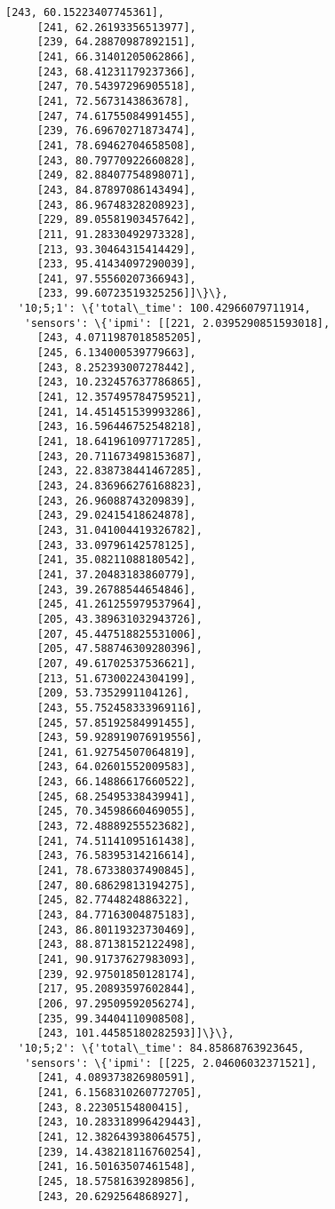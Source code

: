 \documentclass[11pt]{article}
\begin{document}
\begin{tcolorbox}[breakable, size=fbox, boxrule=.5pt, pad at break*=1mm, opacityfill=0]
\begin{Verbatim}[commandchars=\\\{\}]
     [243, 60.15223407745361],
     [241, 62.26193356513977],
     [239, 64.28870987892151],
     [241, 66.31401205062866],
     [243, 68.41231179237366],
     [247, 70.54397296905518],
     [241, 72.5673143863678],
     [247, 74.61755084991455],
     [239, 76.69670271873474],
     [241, 78.69462704658508],
     [243, 80.79770922660828],
     [249, 82.88407754898071],
     [243, 84.87897086143494],
     [243, 86.96748328208923],
     [229, 89.05581903457642],
     [211, 91.28330492973328],
     [213, 93.30464315414429],
     [233, 95.41434097290039],
     [241, 97.55560207366943],
     [233, 99.60723519325256]]\}\},
  '10;5;1': \{'total\_time': 100.42966079711914,
   'sensors': \{'ipmi': [[221, 2.0395290851593018],
     [243, 4.0711987018585205],
     [245, 6.134000539779663],
     [243, 8.252393007278442],
     [243, 10.232457637786865],
     [241, 12.357495784759521],
     [241, 14.451451539993286],
     [243, 16.596446752548218],
     [241, 18.641961097717285],
     [243, 20.711673498153687],
     [243, 22.838738441467285],
     [243, 24.836966276168823],
     [243, 26.96088743209839],
     [243, 29.02415418624878],
     [243, 31.041004419326782],
     [243, 33.09796142578125],
     [241, 35.08211088180542],
     [241, 37.20483183860779],
     [243, 39.26788544654846],
     [245, 41.261255979537964],
     [205, 43.389631032943726],
     [207, 45.447518825531006],
     [205, 47.588746309280396],
     [207, 49.61702537536621],
     [213, 51.67300224304199],
     [209, 53.7352991104126],
     [243, 55.752458333969116],
     [245, 57.85192584991455],
     [243, 59.928919076919556],
     [241, 61.92754507064819],
     [243, 64.02601552009583],
     [243, 66.14886617660522],
     [245, 68.25495338439941],
     [245, 70.34598660469055],
     [243, 72.48889255523682],
     [241, 74.51141095161438],
     [243, 76.58395314216614],
     [241, 78.67338037490845],
     [247, 80.68629813194275],
     [245, 82.7744824886322],
     [243, 84.77163004875183],
     [243, 86.80119323730469],
     [243, 88.87138152122498],
     [241, 90.91737627983093],
     [239, 92.97501850128174],
     [217, 95.20893597602844],
     [206, 97.29509592056274],
     [235, 99.34404110908508],
     [243, 101.44585180282593]]\}\},
  '10;5;2': \{'total\_time': 84.85868763923645,
   'sensors': \{'ipmi': [[225, 2.04606032371521],
     [241, 4.089373826980591],
     [241, 6.1568310260772705],
     [243, 8.22305154800415],
     [243, 10.283318996429443],
     [241, 12.382643938064575],
     [239, 14.438218116760254],
     [241, 16.50163507461548],
     [245, 18.57581639289856],
     [243, 20.6292564868927],

\end{Verbatim}
\end{tcolorbox}
\end{document}
